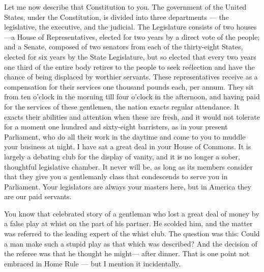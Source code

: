 \documentclass[11pt,openany]{book}
\begin{document}
Let me now describe that Constitution to you. The government of the United States, under the Constitution, is divided into three departments --- the legislative, the executive, and the judicial. The Legislature consists of two houses---a House of Representatives, elected for two years by a direct vote of the people; and a Senate, composed of two senators from each of the thirty-eight States, elected for six years by the State Legislature, but so elected that every two years one third of the entire body retires to the people to seek reélection and have the chance of being displaced by worthier servants. These representatives receive as a compensation for their services one thousand pounds each, per annum. They sit from ten o'clock in the morning till four o'clock in the afternoon, and having paid for the services of these gentlemen, the nation exacts regular attendance. It exacts their abilities and attention when these are fresh, and it would not tolerate for a moment one hundred and sixty-eight barristers, as in your present Parliament, who do all their work in the daytime and come to you to muddle your business at night. I have sat a great deal in your House of Commons. It is largely a debating club for the display of vanity, and it is no longer a sober, thoughtful legislative chamber. It never will be, as long as its members consider that they give you a gentlemanly class that condescends to serve you in Parliament. Your legislators are always your masters here, but in America they are our paid servants.

You know that celebrated story of a gentleman who lost a great deal of money by a false play at whist on the part of his partner. He scolded him, and the matter was referred to the leading expert of the whist club. The question was this: Could a man make such a stupid play as that which was described? And the decision of the referee was that he thought he might--- after dinner. That is one point not embraced in Home Rule --- but I mention it incidentally.
\end{document}

